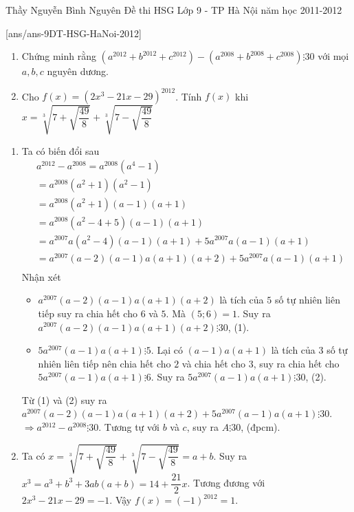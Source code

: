 
\begin{name}
{Thầy  Nguyễn Bình Nguyên}
{Đề thi HSG Lớp 9 - TP Hà Nội năm học 2011-2012}
\end{name}
\setcounter{ex}{0}
[ans/ans-9DT-HSG-HaNoi-2012]

\begin{ex}%
    \hfill
    \begin{enumerate}
        \item Chứng minh rằng $(a^{2012}+b^{2012}+c^{2012})-(a^{2008}+b^{2008}+c^{2008}) \vdots 30$ với mọi $a,b,c$ nguyên dương.
        \item Cho $f\left(x\right)=\left(2x^3-21x-29\right)^{2012}$. Tính $f\left(x\right)$ khi $x=\sqrt[3]{7+\sqrt{\dfrac{49}{8}}} +\sqrt[3]{7-\sqrt{\dfrac{49}{8}}}$
    \end{enumerate}
\loigiai
    {\begin{enumerate}
    		\item Ta có biến đổi sau
    		 \begin{align*}
    		&a^{2012}-a^{2008}=a^{2008}\left(a^{4}-1\right)\\
    		&=a^{2008}(a^{2}+1)(a^{2}-1)\\
    		&=a^{2008}(a^{2}+1)(a-1)(a+1)\\
    		&=a^{2008}(a^{2}-4+5)(a-1)(a+1)\\
    		&=a^{2007}a(a^{2}-4)(a-1)(a+1)+5a^{2007}a(a-1)(a+1)\\
    		&=a^{2007}(a-2)(a-1)a(a+1)(a+2)+5a^{2007}a(a-1)(a+1)\\
    		\end{align*}
    		Nhận xét 
    		\begin{itemize}
    			\item $a^{2007}(a-2)(a-1)a(a+1)(a+2)$ là tích của $5$ số tự nhiên liên tiếp suy ra chia hết cho $6$ và $5$.
    			Mà $\left(5;6\right)=1$. Suy ra $a^{2007}(a-2)(a-1)a(a+1)(a+2) \vdots 30$, (1).
    			\item $5a^{2007}(a-1)a(a+1) \vdots 5$. 
    			Lại có $(a-1)a(a+1)$ là tích của $3$ số tự nhiên liên tiếp nên chia hết cho $2$ và chia hết cho $3$, suy ra chia hết cho $5a^{2007}(a-1)a(a+1) \vdots 6$.
    			Suy ra $5a^{2007}(a-1)a(a+1) \vdots 30$, (2).
    		\end{itemize} 
    		Từ (1) và (2) suy ra 
    	$a^{2007}(a-2)(a-1)a(a+1)(a+2)+5a^{2007}(a-1)a(a+1) \vdots 30$.
    	$\Rightarrow a^{2012}-a^{2008}\vdots 30$. Tương tự với  $b$ và $c$, suy ra $A \vdots 30$, (đpcm).
    	\item Ta có $x=\sqrt[3]{7+\sqrt{\dfrac{49}{8}}} +\sqrt[3]{7-\sqrt{\dfrac{49}{8}}}=a+b$. Suy ra $x^3=a^3+b^3+3ab\left(a+b\right)=14+\dfrac{21}{2}x$. Tương đương với $2x^3-21x-29=-1$. Vậy $f\left(x\right)=\left(-1\right)^{2012}=1$.
    	\end{enumerate}
    }
\end{ex}

